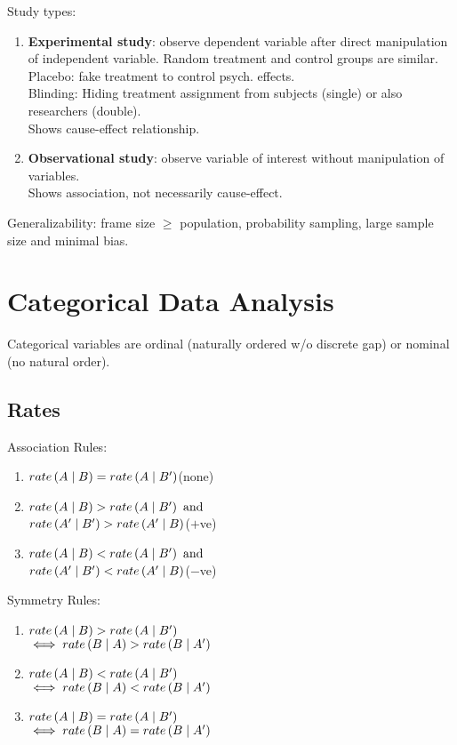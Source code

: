 \documentclass[12pt, a4paper]{article}
\begin{document}
\begin{multicols*}{3}
Study types:
\begin{enumerate}[\roman*.]
  \item \textbf{Experimental study}: observe dependent variable after direct manipulation of independent variable. Random treatment and control groups are similar.\\ 
    Placebo: fake treatment to control psych. effects.\\
    Blinding: Hiding treatment assignment from subjects (single) or also researchers (double).\\
    Shows cause-effect relationship.

  \item \textbf{Observational study}: observe variable of interest without manipulation of variables. \\Shows association, not necessarily cause-effect. 
\end{enumerate}

Generalizability: frame size $\geq$ population, probability sampling, large sample size and minimal bias.
\section{Categorical Data Analysis}
Categorical variables are ordinal (naturally ordered w/o discrete gap) or nominal (no natural order).

\subsection{Rates}

Association Rules:
\begin{enumerate}[\roman*.]
  \item $\mathord{rate} \left( A\mid B \right) = \mathord{rate} \left( A\mid B' \right)$\hfill(none)
  \item $\mathord{rate} \left( A\mid B \right) > \mathord{rate} \left( A\mid B' \right)\text{ and}$\\$\mathord{rate} \left( A'\mid B' \right) > \mathord{rate} \left( A'\mid B \right)$\hfill($+$ve)
  \item $\mathord{rate} \left( A\mid B \right) < \mathord{rate} \left( A\mid B' \right)\text{ and}$\\$\mathord{rate} \left( A'\mid B' \right) < \mathord{rate} \left( A'\mid B \right)$\hfill($-$ve)
\end{enumerate}

Symmetry Rules:
\begin{enumerate}[\roman*.]
  \item $\mathord{rate} \left( A\mid B \right) > \mathord{rate} \left( A\mid B' \right)$ \\$\iff \mathord{rate} \left( B\mid A \right) > \mathord{rate} \left( B\mid A' \right)$
  \item $\mathord{rate} \left( A\mid B \right) < \mathord{rate} \left( A\mid B' \right)$ \\$\iff \mathord{rate} \left( B\mid A \right) < \mathord{rate} \left( B\mid A' \right)$
  \item $\mathord{rate} \left( A\mid B \right) = \mathord{rate} \left( A\mid B' \right)$ \\$\iff \mathord{rate} \left( B\mid A \right) = \mathord{rate} \left( B\mid A' \right)$
\end{enumerate}


\end{multicols*}
\end{document}
